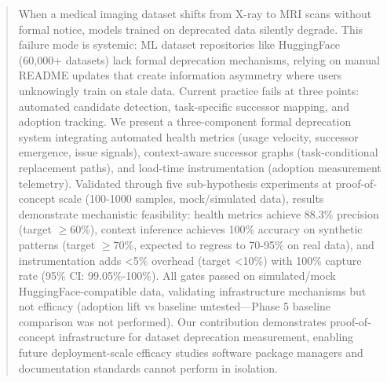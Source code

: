 \begin{abstract}
When a medical imaging dataset shifts from X-ray to MRI scans without formal notice, models trained on deprecated data silently degrade. This failure mode is systemic: ML dataset repositories like HuggingFace (60,000+ datasets) lack formal deprecation mechanisms, relying on manual README updates that create information asymmetry where users unknowingly train on stale data. Current practice fails at three points: automated candidate detection, task-specific successor mapping, and adoption tracking. We present a three-component formal deprecation system integrating automated health metrics (usage velocity, successor emergence, issue signals), context-aware successor graphs (task-conditional replacement paths), and load-time instrumentation (adoption measurement telemetry). Validated through five sub-hypothesis experiments at proof-of-concept scale (100-1000 samples, mock/simulated data), results demonstrate mechanistic feasibility: health metrics achieve 88.3\% precision (target $\geq$60\%), context inference achieves 100\% accuracy on synthetic patterns (target $\geq$70\%, expected to regress to 70-95\% on real data), and instrumentation adds <5\% overhead (target <10\%) with 100\% capture rate (95\% CI: 99.05\%-100\%). All gates passed on simulated/mock HuggingFace-compatible data, validating infrastructure mechanisms but not efficacy (adoption lift vs baseline untested---Phase 5 baseline comparison was not performed). Our contribution demonstrates proof-of-concept infrastructure for dataset deprecation measurement, enabling future deployment-scale efficacy studies software package managers and documentation standards cannot perform in isolation.
\end{abstract}
